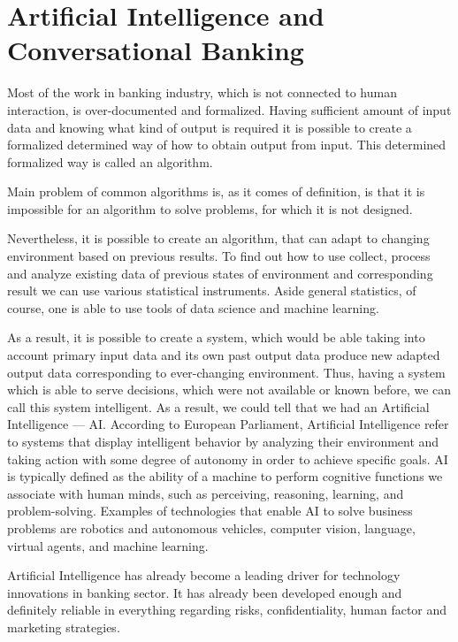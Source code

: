 
\chapter{Artificial Intelligence and Conversational Banking}

Most of the work in banking industry, which is not connected to human interaction, is over-documented and formalized. 
Having sufficient amount of input data and knowing what kind of output is required it is possible to create a formalized determined way of how to obtain output from input. 
This determined formalized way is called an algorithm.

Main problem of common algorithms is, as it comes of definition, is that it is impossible for an algorithm to solve problems, for which it is not designed.

Nevertheless, it is possible to create an algorithm, that can adapt to changing environment based on previous results.
To find out how to use collect, process and analyze existing data of previous states of environment and corresponding result we can use various statistical instruments.
Aside general statistics, of course, one is able to use tools of data science and machine learning.

As a result, it is possible to create a system, which would be able taking into account primary input data and its own past output data produce new adapted output data corresponding to ever-changing environment.
Thus, having a system which is able to serve decisions, which were not available or known before, we can call this system intelligent.
As a result, we could tell that we had an Artificial Intelligence — AI.
According to European Parliament, Artificial Intelligence refer to systems that display intelligent behavior by analyzing their environment and taking action with some degree of autonomy in order to achieve specific goals.
\cite{ai_ep_definition}
AI is typically defined as the ability of a machine to perform cognitive functions we associate with human minds, such as perceiving, reasoning, learning, and problem-solving. 
Examples of technologies that enable AI to solve business problems are robotics and autonomous vehicles, computer vision, language, virtual agents, and machine learning.
\cite{executive_guide_to_ai}





Artificial Intelligence has already become a leading driver for technology innovations in banking sector.
It has already been developed enough and definitely reliable in everything regarding risks, confidentiality, human factor and marketing strategies.

